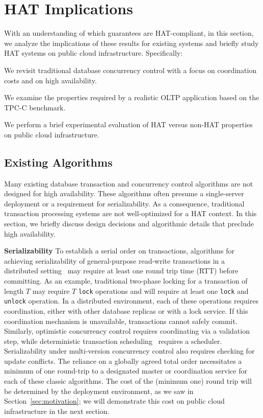 
\section{HAT Implications}
\label{sec:evaluation}

With an understanding of which guarantees are HAT-compliant, in this
section, we analyze the implications of these results for existing
systems and briefly study HAT systems on public cloud
infrastructure. Specifically:

\begin{myenumerate}
\item We revisit traditional database concurrency control with a focus
  on coordination costs and on high availability.
\item We examine the properties required by a realistic OLTP
  application based on the TPC-C benchmark.
\item We perform a brief experimental evaluation of HAT versus non-HAT
  properties on public cloud infrastructure.
\end{myenumerate}

\subsection{Existing Algorithms}

Many existing database transaction and concurrency control algorithms
are not designed for high availability. These algorithms often presume
a single-server deployment or a requirement for serializability. As
a consequence, traditional transaction processing systems are not
well-optimized for a HAT context. In this section, we briefly discuss
design decisions and algorithmic details that preclude high
availability.

\vspace{.5em}\noindent\textbf{Serializability} To establish a serial
order on transactions, algorithms for achieving serializability of
general-purpose read-write transactions in a distributed
setting~\cite{bernstein-book} may require at least one round trip time
(RTT) before committing. As an example, traditional two-phase locking
for a transaction of length $T$ may require $T$ \texttt{lock}
operations and will require at least one \texttt{lock} and
\texttt{unlock} operation.  In a distributed environment, each of
these operations requires coordination, either with other database
replicas or with a lock service. If this coordination mechanism is
unavailable, transactions cannot safely commit. Similarly, optimistic
concurrency control requires coordinating via a validation step, while
deterministic transaction scheduling~\cite{deterministic-scheduling}
requires a scheduler. Serializability under multi-version concurrency
control also requires checking for update conflicts. The reliance on a
globally agreed total order necessitates a minimum of one round-trip
to a designated master or coordination service for each of these
classic algorithms.  The cost of the (minimum one) round trip will be
determined by the deployment environment, as we saw in
Section~\ref{sec:motivation}; we will demonstrate this cost on public
cloud infrastructure in the next section.

